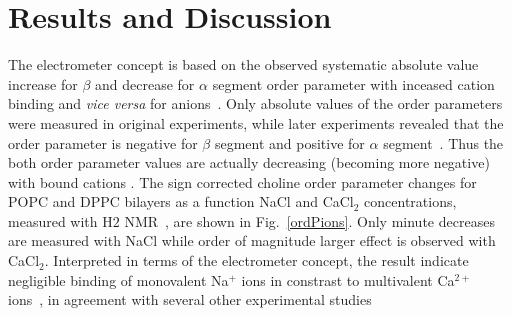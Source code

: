 \documentclass[pre,aps,floatfix,authordate1-4,twocolumn]{revtex4-1}
\begin{document}
\section{Results and Discussion}
The electrometer concept is based on the observed systematic absolute value increase for $\beta$ 
and decrease for $\alpha$ segment order parameter with inceased cation binding and {\it vice versa} for 
anions~\cite{akutsu81,altenbach84,seelig87,scherer89}. Only absolute values of the  
order parameters were measured in original experiments, while later experiments revealed that the 
order parameter is negative for $\beta$ segment and positive for $\alpha$ segment~\cite{hong95a,hong95b,gross97}. 
Thus the both order parameter values are actually decreasing (becoming more negative) with bound
cations \cite{ollila15}. The sign corrected choline order parameter changes for
POPC and DPPC bilayers as a function NaCl and CaCl$_2$ concentrations, measured with H$ 2$ 
NMR~\cite{akutsu81,altenbach84}, are shown in Fig.~\ref{ordPions}.
Only minute decreases are measured with NaCl while order of magnitude larger effect is observed
with CaCl$_2$. Interpreted in terms of the electrometer concept, the result indicate 
negligible binding of monovalent Na$^+$ ions in constrast to multivalent Ca$^{2+}$ 
ions~\cite{akutsu81,altenbach84}, in agreement with several other experimental 
studies \cite{cevc90,tocanne90,binder02,pabst07,filippov09}
\end{document}
